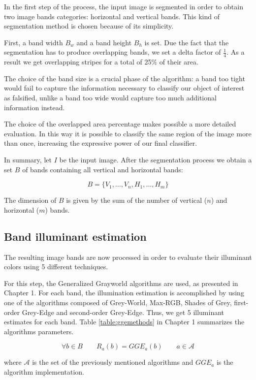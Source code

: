 In the first step of the process, the input image is segmented in order to obtain two image bands categories: horizontal and vertical bands. This kind of segmentation method is chosen because of its simplicity.

First, a band width $B_w$ and a band height $B_h$ is set. Due the fact that the segmentation has to produce overlapping bands, we set a delta factor of $\frac{1}{4}$. As a result we get overlapping stripes for a total of 25\% of their area. 

The choice of the band size is a crucial phase of the algorithm: a band too tight would fail to capture the information necessary to classify our object of interest as falsified, unlike a band too wide would capture too much additional information instead.

The choice of the overlapped area percentage makes possible a more detailed evaluation. In this way it is possible to classify the same region of the image more than once, increasing the expressive power of our final classifier.
 
In summary, let $I$ be the input image. After the segmentation process we obtain a set $B$ of bands containing all vertical and horizontal bands:

$$
B = \{V_1, \ldots, V_n, H_1, \ldots, H_m\}
$$

The dimension of $B$ is given by the sum of the number of vertical ($n$) and horizontal ($m$) bands.

\subsection{Band illuminant estimation}

The resulting image bands are now processed in order to evaluate their illuminant colors using 5 different techniques.

For this step, the Generalized Grayworld \cite{van2007edge} algorithms are used, as presented in Chapter 1. For each band, the illumination estimation is accomplished by using one of the algorithms composed of Grey-World, Max-RGB, Shades of Grey, first-order Grey-Edge and second-order Grey-Edge. Thus, we get 5 illuminant estimates for each band.
Table \ref{table:ggemethods} in Chapter 1 summarizes the algorithms parameters.

$$
\forall b \in B \qquad R_a(b) = GGE_a(b) \qquad a \in \mathcal{A}
$$

where $\mathcal{A}$ is the set of the previously mentioned algorithms and $GGE_a$ is the algorithm implementation.

